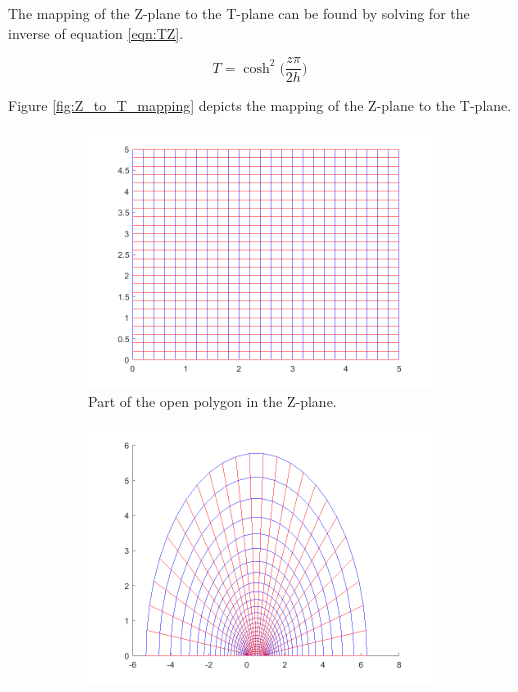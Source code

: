 \par The mapping of the Z-plane to the T-plane can be found by solving for the inverse of equation \ref{eqn:TZ}.

\begin{equation}
     T = \cosh^2\bigg(\frac{z\pi}{2h}\bigg)
     \label{eqn:ZT}
 \end{equation}

\noindent Figure \ref{fig:Z_to_T_mapping} depicts the mapping of the Z-plane to the T-plane.

     \begin{figure}[h]
    \centering
    \begin{subfigure}[t]{0.45\textwidth}
        \centering
        \includegraphics[width=\textwidth]{images/ZtoT_strip.png}
        \caption{Part of the open polygon in the Z-plane.}
    \end{subfigure}
    \hfill
    \begin{subfigure}[t]{0.45\textwidth}
        \centering
        \includegraphics[width=\textwidth]{images/ZtoT_map.png}

\end{subfigure}
\end{figure}
